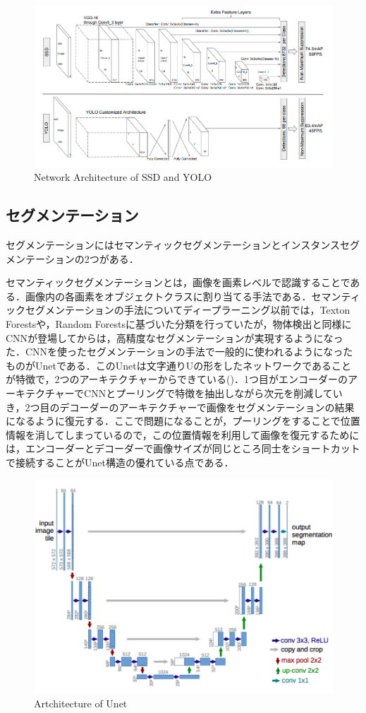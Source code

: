 \begin{figure}[H]
	\centering
	\includegraphics[width=0.7\linewidth]{figure/Review/yolo_ssd.png}
	\caption{Network Architecture of SSD and YOLO\cite{SSD}}
	\label{fig:SSD}
\end{figure}

\subsection*{セグメンテーション}
セグメンテーションにはセマンティックセグメンテーションとインスタンスセグメンテーションの2つがある．

セマンティックセグメンテーションとは，画像を画素レベルで認識することである．画像内の各画素をオブジェクトクラスに割り当てる手法である．セマンティックセグメンテーションの手法についてディープラーニング以前では，Texton Forests\cite{shotton2008semantic}や，Random Forests\cite{kontschieder2011structured}に基づいた分類を行っていたが，物体検出と同様にCNNが登場してからは，高精度なセグメンテーションが実現するようになった．CNNを使ったセグメンテーションの手法で一般的に使われるようになったものがUnetである\cite{Unet}．このUnetは文字通りUの形をしたネットワークであることが特徴で，2つのアーキテクチャーからできている()．1つ目がエンコーダーのアーキテクチャーでCNNとプーリングで特徴を抽出しながら次元を削減していき，2つ目のデコーダーのアーキテクチャーで画像をセグメンテーションの結果になるように復元する．ここで問題になることが，プーリングをすることで位置情報を消してしまっているので，この位置情報を利用して画像を復元するためには，エンコーダーとデコーダーで画像サイズが同じところ同士をショートカットで接続することがUnet構造の優れている点である．

\begin{figure}[H]
	\centering
	\includegraphics[width=0.7\linewidth]{figure/Review/unet.png}
	\caption{Artchitecture of Unet\cite{Unet}}
	\label{fig:Unet}
\end{figure}

